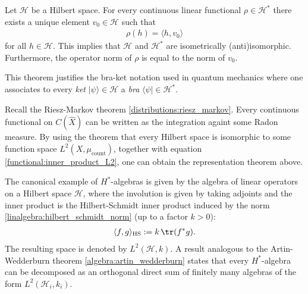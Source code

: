     \begin{theorem}\label{functional:riesz}
        Let $\mathcal{H}$ be a Hilbert space. For every continuous linear functional $\rho\in\mathcal{H}^*$ there exists a unique element $v_0\in\mathcal{H}$ such that
        \begin{gather}
            \rho(h) = \langle h,v_0 \rangle
        \end{gather}
        for all $h\in\mathcal{H}$. This implies that $\mathcal{H}$ and $\mathcal{H}^*$ are isometrically (anti)isomorphic. Furthermore, the operator norm of $\rho$ is equal to the norm of $v_0$.
    \end{theorem}
    \begin{remark}
        This theorem justifies the bra-ket notation used in quantum mechanics where one associates to every \textit{ket} $|\psi\rangle\in\mathcal{H}$ a \textit{bra} $\langle\psi|\in\mathcal{H}^*$.
    \end{remark}

    \begin{remark}
        Recall the Riesz-Markov theorem \ref{distributions:riesz_markov}. Every continuous functional on $C(\widehat{X})$ can be written as the integration againt some Radon measure. By using the theorem that every Hilbert space is isomorphic to some function space $L^2(X,\mu_\mathrm{count})$, together with equation \eqref{functional:inner_product_L2}, one can obtain the representation theorem above.
    \end{remark}

    \begin{example}\label{functional:hilbert_schmidt_inner_product}
        The canonical example of $H^*$-algebras is given by the algebra of linear operators on a Hilbert space $\mathcal{H}$, where the involution is given by taking adjoints and the inner product is the Hilbert-Schmidt inner product induced by the norm \ref{linalgebra:hilbert_schmidt_norm} (up to a factor $k>0$):
        \begin{gather}
            \langle f,g \rangle_\mathrm{HS} := k\,\tr(f^*g).
        \end{gather}
        The resulting space is denoted by $L^2(\mathcal{H},k)$. A result analogous to the Artin-Wedderburn theorem \ref{algebra:artin_wedderburn} states that every $H^*$-algebra can be decomposed as an orthogonal direct sum of finitely many algebras of the form $L^2(\mathcal{H}_i,k_i)$.
    \end{example}

